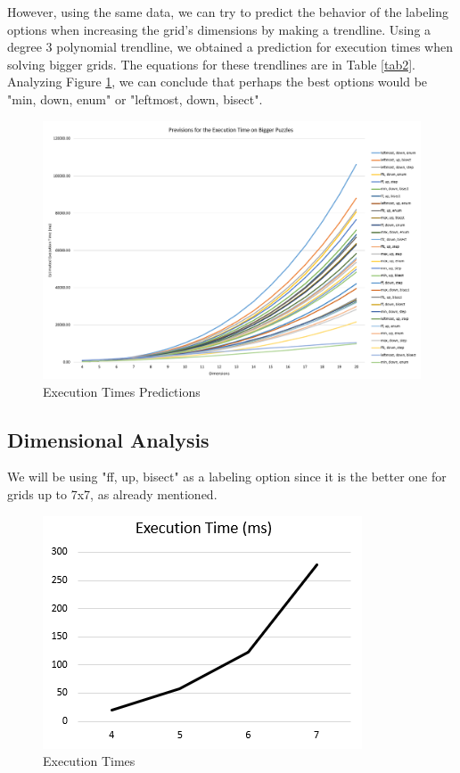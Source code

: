 \documentclass[runningheads]{llncs}
\begin{document}
However, using the same data, we can try to predict the behavior of the labeling options
    when increasing the grid's dimensions by making a trendline.
Using a degree 3 polynomial trendline, we obtained a prediction for execution times when solving bigger grids.
The equations for these trendlines are in Table \ref{tab2}.
Analyzing Figure \ref{fig4}, we can conclude that perhaps the best options would be
    "min, down, enum" or "leftmost, down, bisect".

\begin{figure} [h]
    \centering
    \includegraphics[width=\textwidth]{img/previsions.png}
    \caption{Execution Times Predictions} \label{fig4}
\end{figure}

\newpage

\subsection{Dimensional Analysis}

We will be using "ff, up, bisect" as a labeling option since it
    is the better one for grids up to 7x7, as already mentioned.

\begin{figure} [h]
    \centering
    \includegraphics[scale=0.6]{img/dimensional_analysis.png}
    \caption{Execution Times} \label{fig5}
\end{figure}
\end{document}
